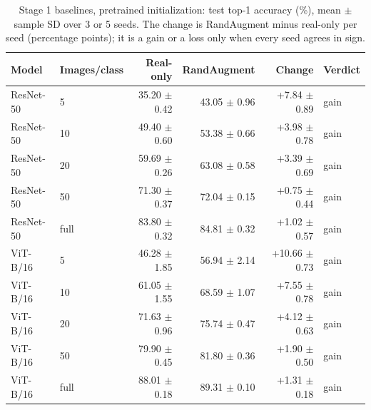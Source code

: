 \begin{table}[H]
\centering
\caption{Stage 1 baselines, pretrained initialization: test top-1 accuracy (\%), mean $\pm$ sample SD over 3 or 5 seeds. The change is RandAugment minus real-only per seed (percentage points); it is a gain or a loss only when every seed agrees in sign.}
\label{tab:stage1-pretrained-accuracy-test}
\begin{tabular}{llrrrl}
\toprule
Model & Images/class & Real-only & RandAugment & Change & Verdict \\
\midrule
ResNet-50 & 5 & 35.20 $\pm$ 0.42 & 43.05 $\pm$ 0.96 & +7.84 $\pm$ 0.89 & gain \\
ResNet-50 & 10 & 49.40 $\pm$ 0.60 & 53.38 $\pm$ 0.66 & +3.98 $\pm$ 0.78 & gain \\
ResNet-50 & 20 & 59.69 $\pm$ 0.26 & 63.08 $\pm$ 0.58 & +3.39 $\pm$ 0.69 & gain \\
ResNet-50 & 50 & 71.30 $\pm$ 0.37 & 72.04 $\pm$ 0.15 & +0.75 $\pm$ 0.44 & gain \\
ResNet-50 & full & 83.80 $\pm$ 0.32 & 84.81 $\pm$ 0.32 & +1.02 $\pm$ 0.57 & gain \\
\midrule
ViT-B/16 & 5 & 46.28 $\pm$ 1.85 & 56.94 $\pm$ 2.14 & +10.66 $\pm$ 0.73 & gain \\
ViT-B/16 & 10 & 61.05 $\pm$ 1.55 & 68.59 $\pm$ 1.07 & +7.55 $\pm$ 0.78 & gain \\
ViT-B/16 & 20 & 71.63 $\pm$ 0.96 & 75.74 $\pm$ 0.47 & +4.12 $\pm$ 0.63 & gain \\
ViT-B/16 & 50 & 79.90 $\pm$ 0.45 & 81.80 $\pm$ 0.36 & +1.90 $\pm$ 0.50 & gain \\
ViT-B/16 & full & 88.01 $\pm$ 0.18 & 89.31 $\pm$ 0.10 & +1.31 $\pm$ 0.18 & gain \\
\bottomrule
\end{tabular}
\end{table}
